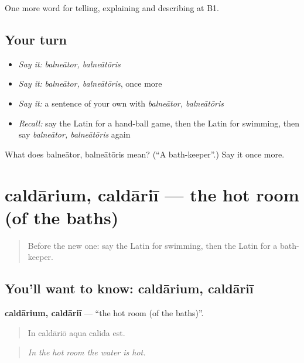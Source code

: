 \begin{grammarlens}[title={What you've built}]
One more word for telling, explaining and describing at B1.
\end{grammarlens}

\subsection*{Your turn}
\begin{itemize}
\raggedright
  \item \emph{Say it:} \emph{balneātor, balneātōris}
  \item \emph{Say it:} \emph{balneātor, balneātōris}, once more
  \item \emph{Say it:} a sentence of your own with \emph{balneātor, balneātōris}
  \item \emph{Recall:} say the Latin for a hand-ball game, then the Latin for swimming, then say \emph{balneātor, balneātōris} again
\end{itemize}

\begin{tcolorbox}[breakable,colback=teal!4,colframe=teal!35!black,title={Before you move on}]
What does balneātor, balneātōris mean? (\textquotedblleft{}A bath-keeper\textquotedblright{}.) Say it once more.
\end{tcolorbox}
\section[caldārium, caldāriī]{caldārium, caldāriī — the hot room (of the baths)}

\label{lesson:LA-C541-caldarium}



\begin{quote}
Before the new one: say the Latin for swimming, then the Latin for a bath-keeper.
\end{quote}

\subsection*{You'll want to know: caldārium, caldāriī}
\textbf{caldārium, caldāriī} — \textquotedblleft{}the hot room (of the baths)\textquotedblright{}.

\begin{quote}
In caldāriō aqua calida est.
\end{quote}

\begin{quote}
\emph{In the hot room the water is hot.}
\end{quote}

